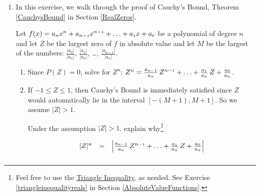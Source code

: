 \begin{enumerate}
\begin{enumerate}


\end{enumerate}


\item  \label{CauchyBoundProofExercise}  In this exercise, we walk through the proof of Cauchy's Bound, Theorem \ref{CauchysBound} in Section \ref{RealZeros}.  

\smallskip

Let $f(x) = a_{n} x^{n} + a_{n-\mbox{\tiny$1$}}x^{n-\mbox{\tiny$1$}} + \ldots + a_{\mbox{\tiny$1$}} x + a_{\mbox{\tiny$0$}}$ be a polynomial of degree $n$ and let $Z$ be the largest zero of $f$ in absolute value and let $M$ be the largest of the numbers: $\frac{|a_{0}|}{|a_{n}|}$, $\frac{|a_{1}|}{|a_{n}|}$, \ldots, $\frac{|a_{n-1}|}{|a_{n}|}$.

\begin{enumerate}

\item  Since $P(Z) = 0$, solve for $Z^{n}$:   $Z^{n} = \frac{a_{n-\mbox{\tiny$1$}}}{a_{n}} \, Z^{n-\mbox{\tiny$1$}} + \ldots + \frac{a_{\mbox{\tiny$1$}}}{a_{n}} \,  Z + \frac{a_{\mbox{\tiny$0$}}}{a_{n}}$.

\item  If $-1 \leq Z \leq 1$, then Cauchy's Bound is immediately satisfied since $Z$ would automatically lie in the interval $\left[-(M+1), M+1\right]$. So we assume $|Z|>1$.  

\smallskip

Under the assumption $|Z|>1$. explain why\footnote{Feel free to use the \href{http://en.wikipedia.org/wiki/Triangle_inequality}{\underline{Triangle Inequality}}, as needed.  See Exercise \ref{triangleinequalityreals} in Section \ref{AbsoluteValueFunctions}.} 

\[\begin{array}{rcl} 

 |Z|^{n} & = &  \left| \frac{a_{n-\mbox{\tiny$1$}}}{a_{n}} \, Z^{n-\mbox{\tiny$1$}} + \ldots + \frac{a_{\mbox{\tiny$1$}}}{a_{n}} \,  Z + \frac{a_{\mbox{\tiny$0$}}}{a_{n}} \right|  \\[10pt]
 

\end{array}\]
\end{enumerate}
\end{enumerate}
